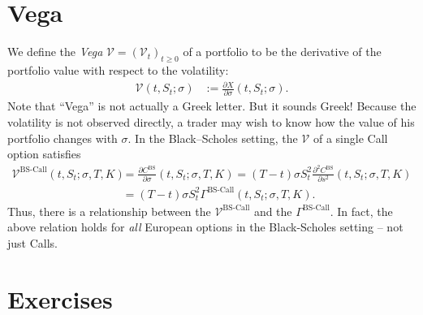 \documentclass[12pt]{book}
\numberwithin{equation}{chapter}
\theoremstyle{plain}
\numberwithin{theorem}{section}
\theoremstyle{definition}
\numberwithin{exercise}{chapter}
\newcommand{\<}{\langle}
\renewcommand{\>}{\rangle}
\renewcommand{\(}{\left(}
\renewcommand{\)}{\right)}
\renewcommand{\[}{\left[}
\renewcommand{\]}{\right]}
\newcommand\Vc{\mathscr{V}}
\newcommand\sig{\sigma}
\renewcommand\d{\partial}
\newcommand\BS{\textrm{BS}}
\theoremstyle{definition}
\numberwithin{question}{section}
\begin{document}
\section{Vega}
We define the \textit{Vega} $\Vc=(\Vc_t)_{t \geq 0}$ of a portfolio to be the derivative of the portfolio value with respect to the volatility:
\begin{align}
\Vc(t,S_t;\sig)
	&:=	\frac{\d X}{\d \sigma}(t,S_t;\sig) .
\end{align}
Note that ``Vega'' is not actually a Greek letter.  But it sounds Greek!  
Because the volatility is not observed directly, a trader may wish to know how the value of his portfolio changes with $\sig$.
In the Black--Scholes setting, the $\mathscr{V}$ of a single Call option satisfies 
\begin{align}
\Vc^\text{BS-Call}(t,S_t;\sig,T,K)
	&=	\frac{\d C^\text{BS}}{\d \sigma}(t,S_t;\sig,T,K)  
	 =  (T-t) \sigma S_t^2 \frac{\d^2 C^\BS}{\d s^2}(t,S_t;\sig,T,K) \\
	&= (T-t) \sigma S_t^2 \Gamma^\text{BS-Call}(t,S_t;\sig,T,K) .
\end{align}
Thus, there is a relationship between the $\Vc^\text{BS-Call}$ and the $\Gamma^\text{BS-Call}$.  In fact, the above relation holds for \textit{all} European options in the Black-Scholes setting -- not just Calls.


\section{Exercises}
\label{sec:exer-6}
\end{document}
